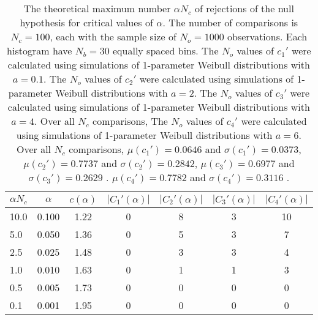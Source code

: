 \begin{table}[!h]
\begin{center}
\begin{tabular}{| l | c | c | c | c | c | c |}\hline
$\alpha N_c$ & $\alpha$ & $c(\alpha)$ & $|C_1'(\alpha)|$ & $|C_2'(\alpha)|$ & $|C_3'(\alpha)|$ & $|C_4'(\alpha)|$ \\\hline
10.0 & 0.100 & 1.22 & 0 & 8 & 3 & 10 \\\hline
5.0 & 0.050 & 1.36 & 0 & 5 & 3 & 7 \\\hline
2.5 & 0.025 & 1.48 & 0 & 3 & 3 & 4 \\\hline
1.0 & 0.010 & 1.63 & 0 & 1 & 1 & 3 \\\hline
0.5 & 0.005 & 1.73 & 0 & 0 & 0 & 0 \\\hline
0.1 & 0.001 & 1.95 & 0 & 0 & 0 & 0 \\\hline
\end{tabular}
\caption{The theoretical maximum number $\alpha N_c$ of rejections
of the null hypothesis for critical values of $\alpha$.
The number of comparisons is $N_c=100$,
each with the sample size of $N_o=1000$ observations.
Each histogram have $N_b=30$ equally spaced bins.
The $N_o$ values of $c_1'$ were calculated using simulations of
 1-parameter Weibull distributions with $a=0.1$.
The $N_o$ values of $c_2'$ were calculated using simulations of
 1-parameter Weibull distributions with $a=2$.
The $N_o$ values of $c_3'$ were calculated using simulations of
 1-parameter Weibull distributions with $a=4$.
Over all $N_c$ comparisons,
The $N_o$ values of $c_4'$ were calculated using simulations of
 1-parameter Weibull distributions with $a=6$.
Over all $N_c$ comparisons,
 $\mu(c_1')=0.0646$ and $\sigma(c_1')=0.0373$,
 $\mu(c_2')=0.7737$ and $\sigma(c_2')=0.2842$,
 $\mu(c_3')=0.6977$ and $\sigma(c_3')=0.2629$ .
 $\mu(c_4')=0.7782$ and $\sigma(c_4')=0.3116$ .
}
\end{center}
\end{table}
